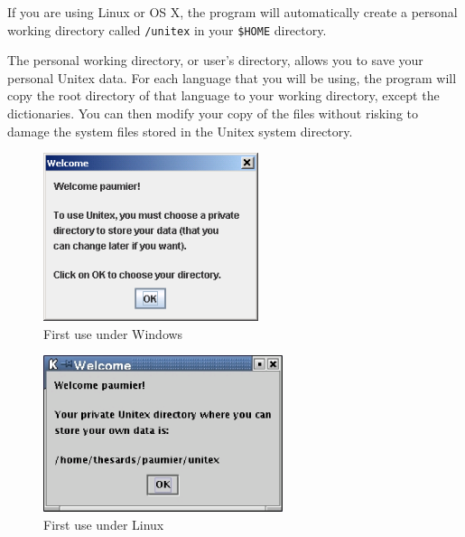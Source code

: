 \bigskip
\noindent If you are using Linux or OS X, the program will automatically create a
personal working directory called \verb+/unitex+ in your \verb+$HOME+ directory.

\bigskip
\noindent The personal working directory, or user's directory, allows
you to save your personal Unitex data. For each language that you will be using, the
program will copy the root directory of that language to your working
directory, except the dictionaries. You can then modify your copy of the
files without risking to damage the system files stored in the
Unitex system directory.

\begin{figure}[!ht]
\begin{center}
\includegraphics[width=6.3cm]{resources/img/fig1-1.png}
\caption{First use under Windows}
\end{center}
\end{figure}

\begin{figure}[!ht]
\begin{center}
\includegraphics[width=7cm]{resources/img/fig1-2.png}
\caption{First use under Linux}
\end{center}
\end{figure}

